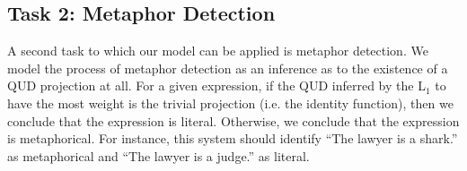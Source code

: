 \documentclass[10pt,letterpaper,twocolumn]{article}
\begin{document}








\subsection{Task 2: Metaphor Detection}

A second task to which our model can be applied is metaphor detection. We model the process of metaphor detection as an inference as to the existence of a QUD projection at all. For a given expression, if the QUD inferred by the L$_1$ to have the most weight is the trivial projection (i.e. the identity function), then we conclude that the expression is literal. Otherwise, we conclude that the expression is metaphorical. For instance, this system should identify ``The lawyer is a shark.'' as metaphorical and ``The lawyer is a judge.'' as literal.
\end{document}
